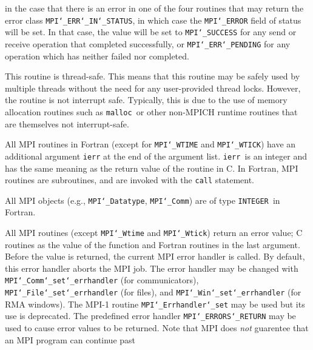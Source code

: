 in the case that there is an error in one of the four routines that
may return the error class {\tt MPI{\tt \char`\_}ERR{\tt \char`\_}IN{\tt \char`\_}STATUS}, in which case the
{\tt MPI{\tt \char`\_}ERROR} field of status will be set.  In that case, the value
will be set to {\tt MPI{\tt \char`\_}SUCCESS} for any send or receive operation that completed
successfully, or {\tt MPI{\tt \char`\_}ERR{\tt \char`\_}PENDING} for any operation which has neither
failed nor completed.
\par
{}
\par
This routine is thread-safe.  This means that this routine may be
safely used by multiple threads without the need for any user-provided
thread locks.  However, the routine is not interrupt safe.  Typically,
this is due to the use of memory allocation routines such as {\tt malloc
}or other non-MPICH runtime routines that are themselves not interrupt-safe.
\par
{}
All MPI routines in Fortran (except for {\tt MPI{\tt \char`\_}WTIME} and {\tt MPI{\tt \char`\_}WTICK}) have
an additional argument {\tt ierr} at the end of the argument list.  {\tt ierr
}is an integer and has the same meaning as the return value of the routine
in C.  In Fortran, MPI routines are subroutines, and are invoked with the
{\tt call} statement.
\par
All MPI objects (e.g., {\tt MPI{\tt \char`\_}Datatype}, {\tt MPI{\tt \char`\_}Comm}) are of type {\tt INTEGER
}in Fortran.
\par
{}
\par
All MPI routines (except {\tt MPI{\tt \char`\_}Wtime} and {\tt MPI{\tt \char`\_}Wtick}) return an error value;
C routines as the value of the function and Fortran routines in the last
argument.  Before the value is returned, the current MPI error handler is
called.  By default, this error handler aborts the MPI job.  The error handler
may be changed with {\tt MPI{\tt \char`\_}Comm{\tt \char`\_}set{\tt \char`\_}errhandler} (for communicators),
{\tt MPI{\tt \char`\_}File{\tt \char`\_}set{\tt \char`\_}errhandler} (for files), and {\tt MPI{\tt \char`\_}Win{\tt \char`\_}set{\tt \char`\_}errhandler} (for
RMA windows).  The MPI-1 routine {\tt MPI{\tt \char`\_}Errhandler{\tt \char`\_}set} may be used but
its use is deprecated.  The predefined error handler
{\tt MPI{\tt \char`\_}ERRORS{\tt \char`\_}RETURN} may be used to cause error values to be returned.
Note that MPI does {\em not} guarentee that an MPI program can continue past
